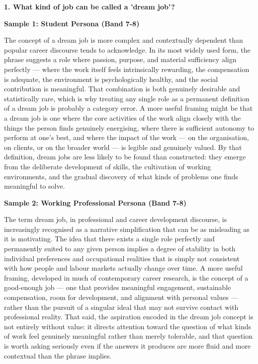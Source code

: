 \partthreeheader

\begin{ieltsquestion}
\textbf{1. What kind of job can be called a 'dream job'?}
\end{ieltsquestion}
\textbf{Sample 1: Student Persona (Band 7-8)}

The concept of a dream job is more complex and contextually dependent than popular career discourse tends to acknowledge. In its most widely used form, the phrase suggests a role where passion, purpose, and material sufficiency align perfectly — where the work itself feels intrinsically rewarding, the compensation is adequate, the environment is psychologically healthy, and the social contribution is meaningful. That combination is both genuinely desirable and statistically rare, which is why treating any single role as a permanent definition of a dream job is probably a category error. A more useful framing might be that a dream job is one where the core activities of the work align closely with the things the person finds genuinely energising, where there is sufficient autonomy to perform at one's best, and where the impact of the work — on the organisation, on clients, or on the broader world — is legible and genuinely valued. By that definition, dream jobs are less likely to be found than constructed: they emerge from the deliberate development of skills, the cultivation of working environments, and the gradual discovery of what kinds of problems one finds meaningful to solve.

\textbf{Sample 2: Working Professional Persona (Band 7-8)}

The term dream job, in professional and career development discourse, is increasingly recognised as a narrative simplification that can be as misleading as it is motivating. The idea that there exists a single role perfectly and permanently suited to any given person implies a degree of stability in both individual preferences and occupational realities that is simply not consistent with how people and labour markets actually change over time. A more useful framing, developed in much of contemporary career research, is the concept of a good-enough job — one that provides meaningful engagement, sustainable compensation, room for development, and alignment with personal values — rather than the pursuit of a singular ideal that may not survive contact with professional reality. That said, the aspiration encoded in the dream job concept is not entirely without value: it directs attention toward the question of what kinds of work feel genuinely meaningful rather than merely tolerable, and that question is worth asking seriously even if the answers it produces are more fluid and more contextual than the phrase implies.

